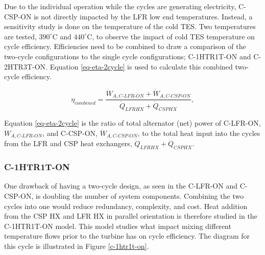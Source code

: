 \begin{paracol}{2}
\linenumbers
\switchcolumn

 Due to the individual operation while the cycles are generating electricity, C-CSP-ON is not directly impacted by the LFR low end temperatures. Instead, a sensitivity study is done on the temperature of the cold TES. Two temperatures are tested, $390^{\circ}$C and $440^{\circ}$C, to observe the impact of cold TES temperature on cycle efficiency. Efficiencies need to be combined to draw a comparison of the two-cycle configurations to the single cycle configurations; C-1HTR1T-ON and C-2HTR3T-ON. Equation \ref{eq-eta-2cycle} is used to calculate this combined two-cycle efficiency.

 \begin{equation}
    \label{eq-eta-2cycle}
    \eta_{combined} = \frac{\dot{W}_{A,C\text{-}LFR\text{-}ON}+\dot{W}_{A,C\text{-}CSP\text{-}ON}}{\dot{Q}_{LFRHX}+\dot{Q}_{CSPHX}},
\end{equation}

Equation \ref{eq-eta-2cycle} is the ratio of total alternator (net) power of C-LFR-ON, $\dot{W}_{A,C\text{-}LFR\text{-}ON}$, and C-CSP-ON, $\dot{W}_{A,C\text{-}CSP\text{-}ON}$, to the total heat input into the cycles from the LFR and CSP heat exchangers, $\dot{Q}_{LFRHX}+\dot{Q}_{CSPHX}$.




\subsubsection{C-1HTR1T-ON} 

One drawback of having a two-cycle design, as seen in the C-LFR-ON and C-CSP-ON, is doubling the number of system components. Combining the two cycles into one would reduce redundancy, complexity, and cost. Heat addition from the CSP HX and LFR HX in parallel orientation is therefore studied in the C-1HTR1T-ON model. This model studies what impact mixing different temperature flows prior to the turbine has on cycle efficiency. The diagram for this cycle is illustrated in Figure \ref{c-1htr1t-on}.

\end{paracol}

